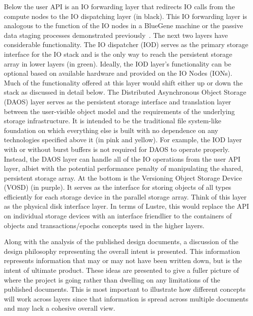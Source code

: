 \documentclass[conference]{IEEEtran}
\begin{document}
Below the user API is an IO forwarding layer that redirects IO calls from the
compute nodes to the IO dispatching layer (in black).  This IO forwarding layer
is analogous to the function of the IO nodes in a BlueGene machine or the
passive data staging processes demonstrated
previously~\cite{nisar:2008:staging,Abbasi:2009:datatap}. The next two layers
have considerable functionality. The IO dispatcher (IOD) serves as the primary
storage interface for the IO stack and is the only way to reach the persistent
storage array in lower layers (in green). Ideally, the IOD layer's
functionality can be optional based on available hardware and provided on the
IO Nodes (IONs). Much of the functionality offered at this layer would shift
either up or down the stack as discussed in detail below. The Distributed
Asynchronous Object Storage (DAOS) layer serves as the persistent storage
interface and translation layer between the user-visible object model and the
requirements of the underlying storage infrastructure. It is intended to be the
traditional file system-like foundation on which everything else is built with
no dependence on any technologies specified above it (in pink and yellow). For
example, the IOD layer with or without burst buffers is not required for DAOS
to operate properly.  Instead, the DAOS layer can handle all of the IO
operations from the user API layer, albiet with the potential performance
penalty of manipulating the shared, persistent storage array. At the bottom is
the Versioning Object Storage Device (VOSD) (in purple).  It serves as the
interface for storing objects of all types efficiently for each storage device
in the parallel storage array. Think of this layer as the physical disk
interface layer. In terms of Lustre, this would replace the API on individual
storage devices with an interface friendlier to the containers of objects and
transactions/epochs concepts used in the higher layers.

Along with the analysis of the published design documents, a discussion of the
design philosophy representing the overall intent is presented. This
information represents information that may or may not have been written down,
but is the intent of ultimate product.  These ideas are presented to give a
fuller picture of where the project is going rather than dwelling on any
limitations of the published documents. This is most important to illustrate
how different concepts will work across layers since that information is spread
across multiple documents and may lack a cohesive overall view.
\end{document}
